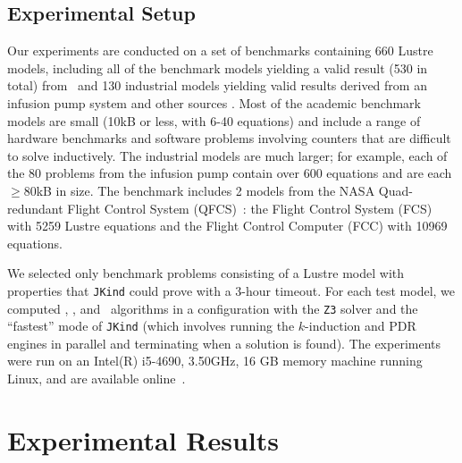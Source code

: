\subsection{Experimental Setup}

Our experiments are conducted on a set of benchmarks containing 660 Lustre models, including all of the benchmark models yielding a valid result (530 in total) from~\cite{Hagen08:FMCAD, piskac2016} and 130 industrial models yielding valid results derived from an infusion pump system \cite{hilt2013} and other sources \cite{piskac2016, NFM2015:backes}.
Most of the academic benchmark models are small (10kB or less, with 6-40 equations) and include a range of hardware benchmarks and software problems involving counters that are difficult to solve inductively.
The industrial models are much larger; for example, each of the 80 problems from the infusion pump \cite{hilt2013} contain over 600 equations and are each $\geq$80kB in size. The benchmark includes 2 models from the NASA Quad-redundant Flight Control System (QFCS)~\cite{NFM2015:backes}: the Flight Control System (FCS) with 5259 Lustre equations and the Flight Control Computer (FCC) with 10969 equations.

We selected only benchmark problems consisting of a Lustre model with
properties that \texttt{JKind} could prove with a 3-hour timeout.
For each test model, we computed \aivcalg, \ucalg, and \ucbfalg ~algorithms in a configuration with the \texttt{Z3} solver and the ``fastest'' mode of \texttt{JKind} (which involves running the $k$-induction and PDR engines in parallel and terminating when a solution is found). The experiments were run on an  Intel(R) i5-4690, 3.50GHz, 16 GB memory machine running Linux, and are available online~\cite{expr}.%



\section{Experimental Results}

 